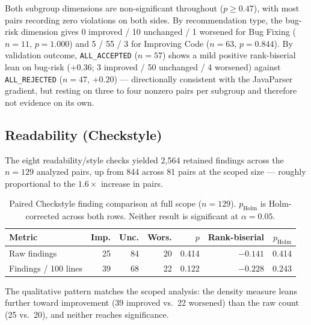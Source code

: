 Both subgroup dimensions are non-significant throughout ($p\geq0.47$), with most pairs recording zero violations on both sides.
By recommendation type, the bug-risk dimension gives 0 improved / 10 unchanged / 1 worsened for Bug Fixing ($n=11$, $p=1.000$) and 5 / 55 / 3 for Improving Code ($n=63$, $p=0.844$).
By validation outcome, \texttt{ALL\_ACCEPTED} ($n=57$) shows a mild positive rank-biserial lean on bug-risk ($+0.36$; 3 improved / 50 unchanged / 4 worsened) against \texttt{ALL\_REJECTED} ($n=47$, $+0.20$) --- directionally consistent with the JavaParser gradient, but resting on three to four nonzero pairs per subgroup and therefore not evidence on its own.

\subsection{Readability (Checkstyle)}
\label{sec:ba-full-checkstyle}

The eight readability/style checks yielded 2{,}564 retained findings across the $n=129$ analyzed pairs, up from 844 across 81 pairs at the scoped size --- roughly proportional to the $1.6\times$ increase in pairs.

\begin{table}[htbp]
\centering
\caption{Paired Checkstyle finding comparison at full scope ($n=129$).
$p_{\text{Holm}}$ is Holm-corrected across both rows.
Neither result is significant at $\alpha=0.05$.}
\label{tab:ba-full-checkstyle}
\small
\begin{tabular}{lrrrrrr}
\toprule
Metric & Imp. & Unc. & Wors. & $p$ & Rank-biserial & $p_{\text{Holm}}$ \\
\midrule
Raw findings         & 25 & 84 & 20 & 0.414 & $-0.141$ & 0.414 \\
Findings / 100 lines & 39 & 68 & 22 & 0.122 & $-0.228$ & 0.243 \\
\bottomrule
\end{tabular}
\end{table}

The qualitative pattern matches the scoped analysis: the density measure leans further toward improvement (39 improved vs.\ 22 worsened) than the raw count (25 vs.\ 20), and neither reaches significance.

